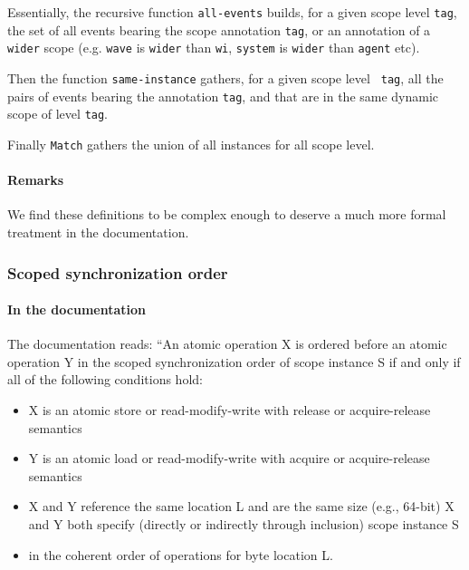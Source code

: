 \documentclass[a4paper]{article}
\begin{document}
Essentially, the recursive function {\tt all-events} builds, for a given scope
level {\tt tag}, the set of all events bearing the scope annotation {\tt tag},
or an annotation of a {\tt wider} scope (e.g. {\tt wave} is {\tt wider} than
{\tt wi}, {\tt system} is {\tt wider} than {\tt agent} etc).

Then the function {\tt same-instance} gathers, for a given scope level {\tt
tag}, all the pairs of events bearing the annotation {\tt tag}, and that are in
the same dynamic scope of level {\tt tag}. 

Finally {\tt Match} gathers the union of all instances for all scope level.

\paragraph{Remarks} We find these definitions to be complex enough to deserve a
much more formal treatment in the documentation.

\subsubsection{Scoped synchronization order \label{sec:sso-first}}
\paragraph{In the documentation}
The documentation reads: 
``An atomic operation X is ordered before an atomic operation Y in the scoped
synchronization order of scope instance S if and only if all of the following
conditions hold:
\begin{itemize}
\item X is an atomic store or read-modify-write with release or acquire-release
semantics
\item Y is an atomic load or read-modify-write with acquire or acquire-release
semantics
\item X and Y reference the same location L and are the same size (e.g.,
64-bit) X and Y both specify (directly or indirectly through inclusion) scope
instance S 
\item  in the coherent order of operations for byte location L.
\end{itemize}
\end{document}
